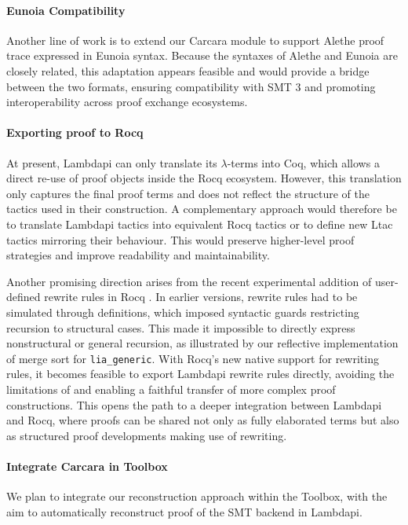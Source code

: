 \paragraph{Eunoia Compatibility} 
Another line of work is to extend our Carcara module to support Alethe proof trace expressed in Eunoia syntax. 
Because the syntaxes of Alethe and Eunoia are closely related, this adaptation appears feasible and would provide a bridge between the two formats, ensuring compatibility with SMT 3 and promoting interoperability across proof exchange ecosystems.


\paragraph{Exporting proof to Rocq}
At present, Lambdapi can only translate its $\lambda$-terms into Coq, which allows a direct re-use of proof objects inside the Rocq ecosystem.
However, this translation only captures the final proof terms and does not reflect the structure of the tactics used in their construction. 
A complementary approach would therefore be to translate Lambdapi tactics into equivalent Rocq tactics or to define new Ltac tactics mirroring their behaviour. 
This would preserve higher-level proof strategies and improve readability and maintainability. 

Another promising direction arises from the recent experimental addition of user-defined rewrite rules in Rocq \cite{rw-rocq}. 
In earlier versions, rewrite rules had to be simulated through \textcolor{lpurple}{\textbf{}} definitions, which imposed syntactic guards restricting recursion to structural cases. 
This made it impossible to directly express nonstructural or general recursion, as illustrated by our reflective implementation of merge sort for \texttt{lia\_generic}. 
With Rocq’s new native support for rewriting rules, it becomes feasible to export Lambdapi rewrite rules directly, avoiding the limitations of \textcolor{lpurple}{\textbf{}} and enabling a faithful transfer of more complex proof constructions. 
This opens the path to a deeper integration between Lambdapi and Rocq, where proofs can be shared not only as fully elaborated terms but also as structured proof developments making use of rewriting.

\paragraph{Integrate Carcara in \tlaplus Toolbox}
We plan to integrate our reconstruction approach within the \tlaplus Toolbox, with the aim to automatically reconstruct proof of the SMT backend in Lambdapi.

